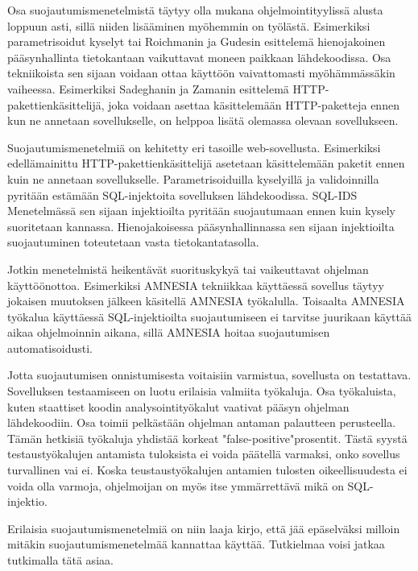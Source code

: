 \documentclass[finnish]{tktltiki2}
\theoremstyle{definition}
\theoremstyle{remark}
\begin{document}
	Osa suojautumismenetelmistä täytyy olla mukana ohjelmointityylissä alusta loppuun asti, sillä niiden lisääminen myöhemmin on työlästä. Esimerkiksi parametrisoidut kyselyt tai Roichmanin ja Gudesin esittelemä hienojakoinen pääsynhallinta tietokantaan vaikuttavat moneen paikkaan lähdekoodissa. Osa tekniikoista sen sijaan voidaan ottaa käyttöön vaivattomasti myöhämmässäkin vaiheessa. Esimerkiksi Sadeghanin ja Zamanin esittelemä HTTP-pakettienkäsittelijä, joka voidaan asettaa käsittelemään HTTP-paketteja ennen kun ne annetaan sovellukselle, on helppoa lisätä olemassa olevaan sovellukseen. 
	
	Suojautumismenetelmiä on kehitetty eri tasoille web-sovellusta. Esimerkiksi edellämainittu HTTP-pakettienkäsittelijä asetetaan käsittelemään paketit ennen kuin ne annetaan sovellukselle. Parametrisoiduilla kyselyillä ja validoinnilla pyritään estämään SQL-injektoita sovelluksen lähdekoodissa. SQL-IDS Menetelmässä sen sijaan injektioilta pyritään suojautumaan ennen kuin kysely suoritetaan kannassa. Hienojakoisessa pääsynhallinnassa sen sijaan injektioilta suojautuminen toteutetaan vasta tietokantatasolla.
	
	Jotkin menetelmistä heikentävät suorituskykyä tai vaikeuttavat ohjelman käyttöönottoa. Esimerkiksi AMNESIA tekniikkaa käyttäessä sovellus täytyy jokaisen muutoksen jälkeen käsitellä AMNESIA työkalulla. Toisaalta AMNESIA työkalua käyttäessä SQL-injektioilta suojautumiseen ei tarvitse juurikaan käyttää aikaa ohjelmoinnin aikana, sillä AMNESIA hoitaa suojautumisen automatisoidusti.
	
	Jotta suojautumisen onnistumisesta voitaisiin varmistua, sovellusta on testattava. Sovelluksen testaamiseen on luotu erilaisia valmiita työkaluja. Osa työkaluista, kuten staattiset koodin analysointityökalut vaativat pääsyn ohjelman lähdekoodiin. Osa toimii pelkästään ohjelman antaman palautteen perusteella. Tämän hetkisiä työkaluja yhdistää korkeat "false-positive"\space prosentit. Tästä syystä testaustyökalujen antamista tuloksista ei voida päätellä varmaksi, onko sovellus turvallinen vai ei. Koska teustaustyökalujen antamien tulosten oikeellisuudesta ei voida olla varmoja, ohjelmoijan on myös itse ymmärrettävä mikä on SQL-injektio.
	
	 Erilaisia suojautumismenetelmiä on niin laaja kirjo, että jää epäselväksi milloin mitäkin suojautumismenetelmää kannattaa käyttää. Tutkielmaa voisi jatkaa tutkimalla tätä asiaa.
	
	
\end{document}
